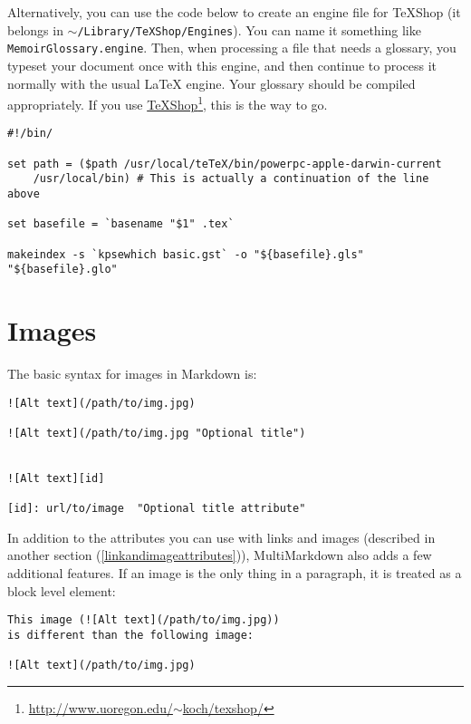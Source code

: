 Alternatively, you can use the code below to create an engine file for TeXShop (it belongs in \texttt{\ensuremath{\sim}\slash{}Library\slash{}TeXShop\slash{}Engines}). You can name it something like \texttt{MemoirGlossary.engine}. Then, when processing a file that needs a glossary, you typeset your document once with this engine, and then continue to process it normally with the usual LaTeX engine. Your glossary should be compiled appropriately. If you use \href{http://www.uoregon.edu/~koch/texshop/}{TeXShop}\footnote{\href{http://www.uoregon.edu/~koch/texshop/}{http:\slash{}\slash{}www.uoregon.edu\slash{}\ensuremath{\sim}koch\slash{}texshop\slash{}}}, this is the way to go.

\begin{verbatim}
#!/bin/	

set path = ($path /usr/local/teTeX/bin/powerpc-apple-darwin-current 
	/usr/local/bin) # This is actually a continuation of the line above

set basefile = `basename "$1" .tex`

makeindex -s `kpsewhich basic.gst` -o "${basefile}.gls" "${basefile}.glo"
\end{verbatim}

\section{Images}
\label{images}

The basic syntax for images in Markdown is:

\begin{verbatim}
![Alt text](/path/to/img.jpg)

![Alt text](/path/to/img.jpg "Optional title")


![Alt text][id]

[id]: url/to/image  "Optional title attribute"
\end{verbatim}

In addition to the attributes you can use with links and images (described in another section (\autoref{linkandimageattributes})), MultiMarkdown also adds a few additional features. If an image is the only thing in a paragraph, it is treated as a block level element:

\begin{verbatim}
This image (![Alt text](/path/to/img.jpg))
is different than the following image:

![Alt text](/path/to/img.jpg)
\end{verbatim}

